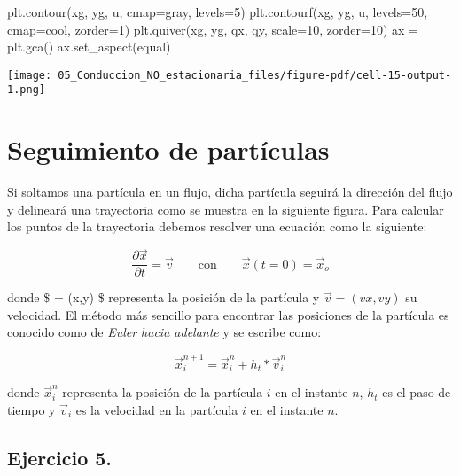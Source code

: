 \documentclass[
  letterpaper,
  DIV=11,
  numbers=noendperiod]{scrreprt}
\newenvironment{Shaded}{\begin{snugshade}}{\end{snugshade}}
\newcommand{\DecValTok}[1]{\textcolor[rgb]{0.68,0.00,0.00}{#1}}
\newcommand{\NormalTok}[1]{\textcolor[rgb]{0.00,0.23,0.31}{#1}}
\newcommand{\OperatorTok}[1]{\textcolor[rgb]{0.37,0.37,0.37}{#1}}
\newcommand{\StringTok}[1]{\textcolor[rgb]{0.13,0.47,0.30}{#1}}
\begin{document}
\begin{Shaded}
\begin{Highlighting}[]
\NormalTok{plt.contour(xg, yg, u, cmap}\OperatorTok{=}\StringTok{\textquotesingle{}gray\textquotesingle{}}\NormalTok{, levels}\OperatorTok{=}\DecValTok{5}\NormalTok{)}
\NormalTok{plt.contourf(xg, yg, u, levels}\OperatorTok{=}\DecValTok{50}\NormalTok{, cmap}\OperatorTok{=}\StringTok{\textquotesingle{}cool\textquotesingle{}}\NormalTok{, zorder}\OperatorTok{=}\DecValTok{1}\NormalTok{)}
\NormalTok{plt.quiver(xg, yg, qx, qy, scale}\OperatorTok{=}\DecValTok{10}\NormalTok{, zorder}\OperatorTok{=}\DecValTok{10}\NormalTok{)}
\NormalTok{ax }\OperatorTok{=}\NormalTok{ plt.gca()}
\NormalTok{ax.set\_aspect(}\StringTok{\textquotesingle{}equal\textquotesingle{}}\NormalTok{)}
\end{Highlighting}
\end{Shaded}

\texttt{[image: 05\_Conduccion\_NO\_estacionaria\_files/figure-pdf/cell-15-output-1.png]}


\chapter{Seguimiento de partículas}\label{seguimiento-de-partuxedculas}

Si soltamos una partícula en un flujo, dicha partícula seguirá la
dirección del flujo y delineará una trayectoria como se muestra en la
siguiente figura. Para calcular los puntos de la trayectoria debemos
resolver una ecuación como la siguiente:

\[
\dfrac{\partial \vec{x}}{ \partial t} = \vec{v} \qquad \text{con} \qquad \vec{x}(t=0) = \vec{x}_o 
\]

donde \$ = (x,y) \$ representa la posición de la partícula y
\(\vec{v} = (vx, vy)\) su velocidad. El método más sencillo para
encontrar las posiciones de la partícula es conocido como de \emph{Euler
hacia adelante} y se escribe como:

\[
\vec{x}_i^{n+1} = \vec{x}_i^{n} + h_t * \vec{v}_{i}^n
\]

donde \(\vec{x}_i^{n}\) representa la posición de la partícula \(i\) en
el instante \(n\), \(h_t\) es el paso de tiempo y \(\vec{v}_i\) es la
velocidad en la partícula \(i\) en el instante \(n\).

\section{Ejercicio 5.}\label{ejercicio-5.}
\end{document}
